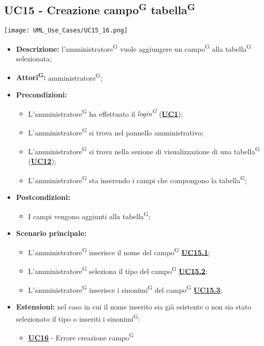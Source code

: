 \subsection{UC15 - Creazione campo\textsuperscript{G} tabella\textsuperscript{G}}
\label{sec:UC15}
\texttt{[image: UML\_Use\_Cases/UC15\_16.png]}
\begin{itemize}
	\item \textbf{Descrizione:} l’amministratore\textsuperscript{G} vuole aggiungere un campo\textsuperscript{G} alla tabella\textsuperscript{G} selezionata;
	\item \textbf{Attori\textsuperscript{G}:} amministratore\textsuperscript{G};
	\item \textbf{Precondizioni:} 
	\begin{itemize}
		\item L’amministratore\textsuperscript{G} ha effettuato il \textit{login\textsuperscript{G}} (\hyperref[sec:UC1]{\textbf{UC1}});
		\item L’amministratore\textsuperscript{G} si trova nel pannello amministrativo;
		\item L’amministratore\textsuperscript{G} si trova nella sezione di visualizzazione di una tabella\textsuperscript{G} (\hyperref[sec:UC12]{\textbf{UC12}});
		\item L’amministratore\textsuperscript{G} sta inserendo i campi che compongono la tabella\textsuperscript{G};
	\end{itemize}
	\item \textbf{Postcondizioni:} 
	\begin{itemize}
		\item I campi vengono aggiunti alla tabella\textsuperscript{G};
	\end{itemize}
	\item \textbf{Scenario principale:} 
	\begin{itemize}
		\item L’amministratore\textsuperscript{G} inserisce il nome del campo\textsuperscript{G} \hyperref[sec:UC15.1]{\textbf{UC15.1}};
		\item L'amministratore\textsuperscript{G} seleziona il tipo del campo\textsuperscript{G} \hyperref[sec:UC15.2]{\textbf{UC15.2}};
		\item L'amministratore\textsuperscript{G} inserisce i sinonimi\textsuperscript{G} del campo\textsuperscript{G} \hyperref[sec:UC15.3]{\textbf{UC15.3}};
	\end{itemize}
	\item \textbf{Estensioni:} nel caso in cui il nome inserito sia già esistente o non sia stato selezionato il tipo o inseriti i sinonimi\textsuperscript{G}:
	\begin{itemize}
		\item \hyperref[sec:UC16]{\textbf{UC16}} - Errore creazione campo\textsuperscript{G}
	\end{itemize}
\end{itemize}

